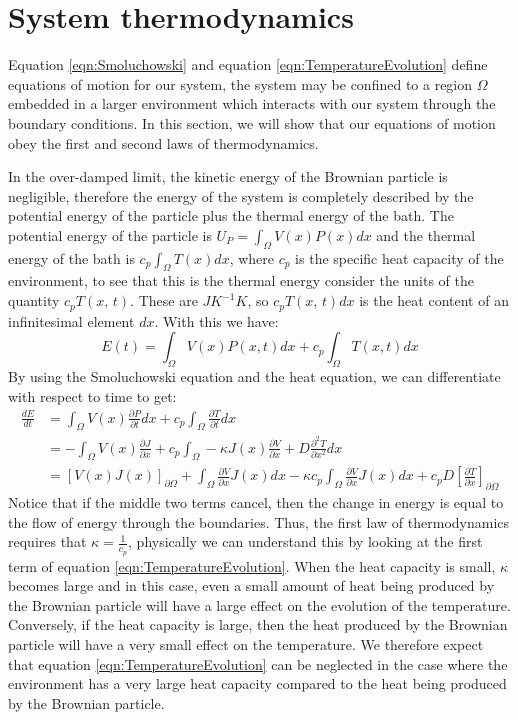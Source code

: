 \section{System thermodynamics} \label{thermodynamics}
Equation \ref{eqn:Smoluchowski} and equation \ref{eqn:TemperatureEvolution} define equations of motion for our system, the system may be confined to a region $\Omega$ embedded in a larger environment which interacts with our system through the boundary conditions. In this section, we will show that our equations of motion obey the first and second laws of thermodynamics.

In the over-damped limit, the kinetic energy of the Brownian particle is negligible, therefore the energy of the system is completely described by the potential energy of the particle plus the thermal energy of the bath. The potential energy of the particle is $U_P = \int_{\Omega} V(x) P(x) dx$ and the thermal energy of the bath is $c_p \int_{\Omega} T(x) dx$, where $c_p$ is the specific heat capacity of the environment, to see that this is the thermal energy consider the units of the quantity $c_p T(x, \, t)$. These are $J K^{-1} K$, so $c_p T(x, \, t) dx$ is the heat content of an infinitesimal element $dx$. With this we have:
\begin{equation}
E(t) = \int_{\Omega} V(x)P(x, t) dx + c_p \int_{\Omega} T(x, t) dx
\end{equation}
By using the Smoluchowski equation and the heat equation, we can differentiate with respect to time to get:
\begin{align}
\frac{d E}{d t} & = \int_{\Omega} V(x) \frac{\partial P}{\partial t} dx + c_p \int_{\Omega} \frac{\partial T}{\partial t} dx \\
 & = -\int_{\Omega} V(x) \frac{\partial J}{\partial x} + c_p \int_{\Omega} -\kappa J(x) \frac{\partial V}{\partial x} + D \frac{\partial^2 T}{\partial x^2} dx \\
 & = [V(x)J(x)]_{\partial \Omega}+ \int_{\Omega} \frac{\partial V}{\partial x} J(x) dx - \kappa c_p \int_{\Omega} \frac{\partial V}{\partial x} J(x) dx + c_p D \left [\frac{\partial T}{\partial x} \right]_{\partial \Omega}
\end{align}
Notice that if the middle two terms cancel, then the change in energy is equal to the flow of energy through the boundaries. Thus, the first law of thermodynamics requires that $\kappa = \frac{1}{c_p}$, physically we can understand this by looking at the first term of equation \ref{eqn:TemperatureEvolution}. When the heat capacity is small, $\kappa$ becomes large and in this case, even a small amount of heat being produced by the Brownian particle will have a large effect on the evolution of the temperature. Conversely, if the heat capacity is large, then the heat produced by the Brownian particle will have a very small effect on the temperature. We therefore expect that equation \ref{eqn:TemperatureEvolution} can be neglected in the case where the environment has a very large heat capacity compared to the heat being produced by the Brownian particle.

